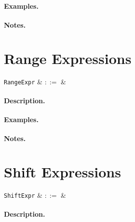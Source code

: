 \paragraph{Examples.}

\paragraph{Notes.} 



\section{Range Expressions}

\begin{syntax}
  \verb+RangeExpr+ & $::=$ &\\
\end{syntax}

\paragraph{Description.}

\paragraph{Examples.}

\paragraph{Notes.} 


\section{Shift Expressions}

\begin{syntax}
  \verb+ShiftExpr+ & $::=$ &\\
\end{syntax}

\paragraph{Description.}

